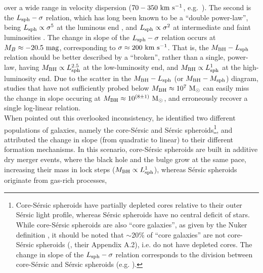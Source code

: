 \documentclass[preprint2]{emulateapj}
\begin{document}
over a wide range in velocity dispersion ($70-350~\rm km~s^{-1}$, e.g.~\citealt{graham2011,mcconnell2011,grahamscott2013}).
The second is the $L_{\rm sph} - \sigma$ relation, 
which has long been known to be a ``double power-law'', 
being $L_{\rm sph} \propto \sigma^5$ at the luminous end \citep{schechter1980,malumuthkrishner1981,vonderlinden2007,liu2008}, 
and $L_{\rm sph} \propto \sigma^2$ at intermediate and faint luminosities 
\citep{davies1983,held1992,matkovicguzman2005,derijcke2005,balcells2007screl,chilingarian2008,forbes2008,cody2009,tortora2009,kourkchi2012}. 
The change in slope of the $L_{\rm sph} - \sigma$ relation occurs at $M_B \approx -20.5\rm~mag$, 
corresponding to $\sigma \approx 200~\rm km~s^{-1}$. 
That is, the $M_{\rm BH} - L_{\rm sph}$ relation should be better described by a ``broken'', rather than a single, power-law, 
having $M_{\rm BH} \propto L_{\rm sph}^{2.5}$ at the low-luminosity end, 
and $M_{\rm BH} \propto L_{\rm sph}^1$ at the high-luminosity end.  
Due to the scatter in the $M_{\rm BH} - L_{\rm sph}$ (or $M_{\rm BH} - M_{\rm sph}$) diagram, 
studies that have not sufficiently probed below $M_{\rm BH} \approx 10^7\rm~M_\odot$ 
can easily miss the change in slope occuring at $M_{\rm BH} \approx 10^{(8 \pm 1)}\rm~M_\odot$, 
and erroneously recover a single log-linear relation. \\
When \cite{graham2012bent} pointed out this overlooked inconsistency, 
he identified two different populations of galaxies, 
namely the core-S\'ersic \citep{graham2003coresersicmodel,trujillo2004coresersicmodel} and S\'ersic 
spheroids\footnote{Core-S\'ersic spheroids have partially depleted cores relative to their outer S\'ersic light profile, 
whereas S\'ersic spheroids have no central deficit of stars. 
While core-S\'ersic spheroids are also ``core galaxies'', as given by the Nuker definition \citep{lauer2007lumell},
it should be noted that $\sim$20\% of ``core galaxies'' are not core-S\'ersic spheroids 
(\citealt{dullograham2014cores}, their Appendix A.2), i.e. do not have depleted cores.
The change in slope of the $L_{\rm sph} - \sigma$ relation corresponds to the division between 
core-S\'ersic and S\'ersic spheroids (e.g. \citealt{grahamguzman2003}).},
and attributed the change in slope (from quadratic to linear) to their different formation mechanisms. 
In this scenario, core-S\'ersic spheroids are built in additive dry merger events, 
where the black hole and the bulge grow at the same pace, increasing their mass in lock steps ($M_{\rm BH} \propto L_{\rm sph}^1$), 
whereas S\'ersic spheroids originate from gas-rich processes, 
\end{document}
